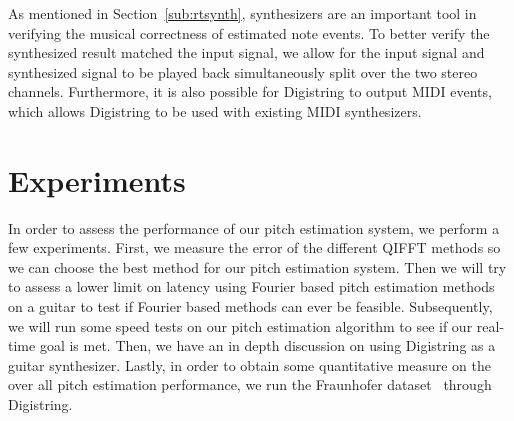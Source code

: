 \documentclass[a4paper,10pt,twocolumn]{article}
\begin{document}
As mentioned in Section~\ref{sub:rtsynth}, synthesizers are an important tool in verifying the musical correctness of estimated note events. To better verify the synthesized result matched the input signal, we allow for the input signal and synthesized signal to be played back simultaneously split over the two stereo channels. Furthermore, it is also possible for Digistring to output MIDI events, which allows Digistring to be used with existing MIDI synthesizers.





\section{Experiments}  \label{sec:exp}
In order to assess the performance of our pitch estimation system, we perform a few experiments. First, we measure the error of the different QIFFT methods so we can choose the best method for our pitch estimation system. Then we will try to assess a lower limit on latency using Fourier based pitch estimation methods on a guitar to test if Fourier based methods can ever be feasible. Subsequently, we will run some speed tests on our pitch estimation algorithm to see if our real-time goal is met. Then, we have an in depth discussion on using Digistring as a guitar synthesizer. Lastly, in order to obtain some quantitative measure on the over all pitch estimation performance, we run the Fraunhofer dataset~\cite{datasetproc, dataset} through Digistring.

\end{document}
